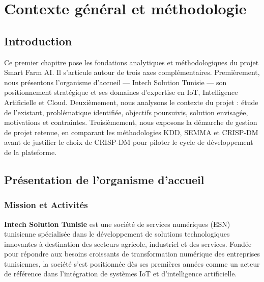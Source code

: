 \documentclass[12pt, a4paper]{report}
\begin{document}
\clearpage

\chapter{Contexte général et méthodologie}

\section{Introduction}

Ce premier chapitre pose les fondations analytiques et méthodologiques du projet Smart Farm AI. Il s'articule autour de trois axes complémentaires. Premièrement, nous présentons l'organisme d'accueil — Intech Solution Tunisie — son positionnement stratégique et ses domaines d'expertise en IoT, Intelligence Artificielle et Cloud. Deuxièmement, nous analysons le contexte du projet : étude de l'existant, problématique identifiée, objectifs poursuivis, solution envisagée, motivations et contraintes. Troisièmement, nous exposons la démarche de gestion de projet retenue, en comparant les méthodologies KDD, SEMMA et CRISP-DM avant de justifier le choix de CRISP-DM pour piloter le cycle de développement de la plateforme.

\section{Présentation de l'organisme d'accueil}

\subsection{Mission et Activités}

\textbf{Intech Solution Tunisie} est une société de services numériques (ESN) tunisienne spécialisée dans le développement de solutions technologiques innovantes à destination des secteurs agricole, industriel et des services. Fondée pour répondre aux besoins croissants de transformation numérique des entreprises tunisiennes, la société s'est positionnée dès ses premières années comme un acteur de référence dans l'intégration de systèmes IoT et d'intelligence artificielle.
\end{document}
